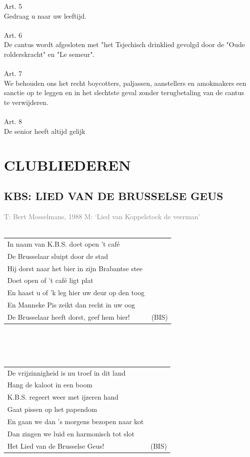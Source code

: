\documentclass[a4paper, 14pt]{extarticle}
\begin{document}
Art. 5\\
Gedraag u naar uw leeftijd.\\\\
Art. 6\\
De cantus wordt afgesloten met "het Tsjechisch drinklied gevolgd door de "Oude rolderskracht" en "Le semeur".\\\\
Art. 7\\
We behouden ons het recht boycotters, paljassen, aanstellers en amokmakers een sanctie op te leggen en in het slechtste geval zonder terugbetaling van de cantus te verwijderen.\\\\
Art. 8\\
De senior heeft altijd gelijk
\newpage
\thispagestyle{empty}
\section*{CLUBLIEDEREN}
\subsection*{KBS: LIED VAN DE BRUSSELSE GEUS}
\textcolor{gray}{\small T: Bert Mosselmans, 1988 M: ‘Lied van Koppelstock de veerman’}
\\\\
\begin{tabularx}{0.8\textwidth}{>{\raggedright\arraybackslash}X c}
    In naam van K.B.S. doet open ’t café \\
    De Brusselaar sluipt door de stad \\
    Hij dorst naar het bier in zijn Brabantse stee \\
    Doet open of ’t café ligt plat \\
    En haast u of ’k leg hier uw deur op den toog \\
    En Manneke Pis zeikt dan recht in uw oog \\
    De Brusselaar heeft dorst, geef hem bier! & (BIS)\\
\end{tabularx}
\\\\\\
\begin{tabularx}{0.8\textwidth}{>{\raggedright\arraybackslash}X c}
De vrijzinnigheid is nu troef in dit land\\
Hang de kaloot in een boom\\
K.B.S. regeert weer met ijzeren hand\\
Gaat pissen op het papendom\\
En gaan we dan ’s morgens bezopen naar kot\\
Dan zingen we luid en harmonisch tot slot\\
    Het Lied van de Brusselse Geus! & (BIS)\\
\end{tabularx}
\end{document}
